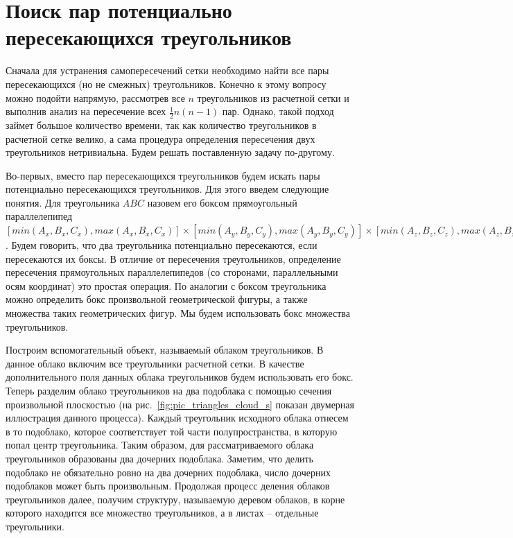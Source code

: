 \documentclass[
11pt,%
tightenlines,%
twoside,%
onecolumn,%
nofloats,%
nobibnotes,%
nofootinbib,%
superscriptaddress,%
noshowpacs,%
centertags]%
{revtex4}
\begin{document}
\section{Поиск пар потенциально пересекающихся треугольников}

Сначала для устранения самопересечений сетки необходимо найти все пары пересекающихся (но не смежных) треугольников.
Конечно к этому вопросу можно подойти напрямую, рассмотрев все $n$ треугольников из расчетной сетки и выполнив анализ на пересечение всех $\frac{1}{2}n(n - 1)$ пар.
Однако, такой подход займет большое количество времени, так как количество треугольников в расчетной сетке велико, а сама процедура определения пересечения двух треугольников нетривиальна.
Будем решать поставленную задачу по-другому.

Во-первых, вместо пар пересекающихся треугольников будем искать пары потенциально пересекающихся треугольников.
Для этого введем следующие понятия.
Для треугольника $ABC$ назовем его боксом прямоугольный параллелепипед $[min(A_x, B_x, C_x), max(A_x, B_x, C_x)] \times [min(A_y, B_y, C_y), max(A_y, B_y, C_y)] \times [min(A_z, B_z, C_z), max(A_z, B_z, C_z)]$.
Будем говорить, что два треугольника потенциально пересекаются, если пересекаются их боксы.
В отличие от пересечения треугольников, определение пересечения прямоугольных параллелепипедов (со сторонами, параллельными осям координат) это простая операция.
По аналогии с боксом треугольника можно определить бокс произвольной геометрической фигуры, а также множества таких геометрических фигур.
Мы будем использовать бокс множества треугольников.

Построим вспомогательный объект, называемый облаком треугольников.
В данное облако включим все треугольники расчетной сетки.
В качестве дополнительного поля данных облака треугольников будем использовать его бокс.
Теперь разделим облако треугольников на два подоблака с помощью сечения произвольной плоскостью (на рис.~\ref{fig:pic_triangles_cloud_s} показан двумерная иллюстрация данного процесса).
Каждый треугольник исходного облака отнесем в то подоблако, которое соответствует той части полупространства, в которую попал центр треугольника.
Таким образом, для рассматриваемого облака треугольников образованы два дочерних подоблака.
Заметим, что делить подоблако не обязательно ровно на два дочерних подоблака, число дочерних подоблаков может быть произвольным.
Продолжая процесс деления облаков треугольников далее, получим структуру, называемую деревом облаков, в корне которого находится все множество треугольников, а в листах -- отдельные треугольники.
\end{document}
